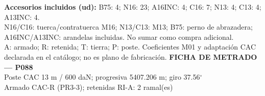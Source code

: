 \begingroup\scriptsize
\textbf{Accesorios incluidos (ud):} B75: 4; N16: 23; A16INC: 4; C16: 7; N13: 4; C13: 4; A13INC: 4.\\
N16/C16: tuerca/contratuerca M16; N13/C13: M13; B75: perno de abrazadera; A16INC/A13INC: arandelas incluidas. No sumar como compra adicional.\\
A: armado; R: retenida; T: tierra; P: poste. Coeficientes M01 y adaptación CAC declarada en el catálogo; no es plano de fabricación.
\endgroup\endgroup
\clearpage{}
\begingroup\small\setlength{\parskip}{3pt}\renewcommand{\arraystretch}{1.05}
\textbf{\large FICHA DE METRADO — P088}\\[4pt]
Poste CAC 13 m / 600 daN; progresiva 5407.206 m; giro 37.56\ensuremath{^\circ}\\
Armado CAC-R (PR3-3); retenidas RI-A: 2 ramal(es)\\
\begingroup\scriptsize
